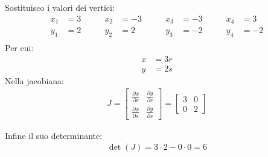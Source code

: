 \begin{esempioBox}
Sostituisco i valori dei vertici:
\begin{align*}
    x_1&= 3 \qquad &x_2&=-3 \qquad &x_3&=-3 \qquad &x_4&=3\\
     y_1&= 2 \qquad &y_2&=2 \qquad &y_3&=-2 \qquad &y_4&=-2\\
\end{align*}
Per cui:
\begin{align*}
    x&=3r\\
    y&=2s
\end{align*}
Nella jacobiana:
\begin{align*}
    J = \begin{bmatrix}
        \frac{\partial x}{\partial r} & \frac{\partial y}{\partial r}\\
        \frac{\partial x}{\partial s} & \frac{\partial y}{\partial s}
    \end{bmatrix} = 
    \begin{bmatrix}
        3 & 0\\
        0 & 2
    \end{bmatrix}
\end{align*}

Infine il suo determinante:
\begin{align*}
    \det(J) = 3 \cdot 2 - 0 \cdot 0 = 6
\end{align*}





\end{esempioBox}
